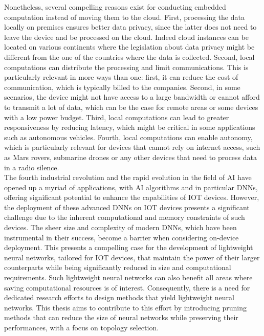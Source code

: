 
Nonetheless, several compelling reasons exist for conducting embedded
computation instead of moving them to the cloud. First, processing the data
locally on premises ensures better data privacy, since the latter does not need
to leave the device and be processed on the cloud. Indeed cloud instances can be
located on various continents where the legislation about data privacy might be
different from the one of the countries where the data is collected. Second,
local computations can distribute the processing and limit communications. This
is particularly relevant in more ways than one: first, it can reduce the cost of
communication, which is typically billed to the companies. Second, in some
scenarios, the device might not have access to a large bandwidth or cannot
afford to transmit a lot of data, which can be the case for remote areas or some
devices with a low power budget. Third, local computations can lead to greater
responsiveness by reducing latency, which might be critical in some applications
such as autonomous vehicles. Fourth, local computations can enable autonomy,
which is particularly relevant for devices that cannot rely on internet access,
such as Mars rovers, submarine drones or any other devices that need to process
data in a radio silence.\\

The fourth industrial revolution and the rapid evolution in the field of \ac{AI}
have opened up a myriad of applications, with \ac{AI} algorithms and in
particular \acp{DNN}, offering significant potential to enhance the capabilities
of \ac{IOT} devices. However, the deployment of these advanced \acp{DNN} on
\ac{IOT} devices presents a significant challenge due to the inherent
computational and memory constraints of such devices. The sheer size and
complexity of modern \acp{DNN}, which have been instrumental in their success,
become a barrier when considering on-device deployment. This presents a
compelling case for the development of lightweight neural networks, tailored for
\ac{IOT} devices, that maintain the power of their larger counterparts while
being significantly reduced in size and computational requirements. Such
lightweight neural networks can also benefit all areas where saving
computational resources is of interest. Consequently, there is a need for
dedicated research efforts to design methods that yield lightweight neural
networks. This thesis aims to contribute to this effort by introducing pruning
methods that can reduce the size of neural networks while preserving their
performances, with a focus on topology selection.\\

